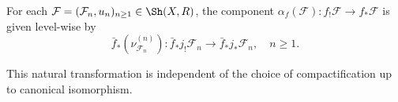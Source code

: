 \begin{definition}
For each $\mathcal{F} = (\mathcal{F}_n, u_n)_{n \geq 1} \in \Sh(X, R)$, the component $\alpha_f(\mathcal{F}): f_! \mathcal{F} \to f_* \mathcal{F}$ is given level-wise by
$$\bar{f}_*(\nu^{(n)}_{\mathcal{F}_n}): \bar{f}_* j_! \mathcal{F}_n \longrightarrow \bar{f}_* j_* \mathcal{F}_n, \quad n \geq 1.$$

This natural transformation is independent of the choice of compactification up to canonical isomorphism.
\end{definition}
